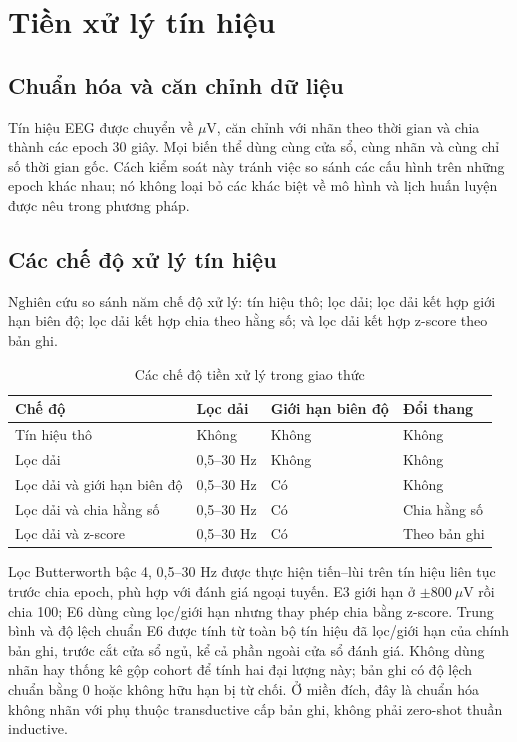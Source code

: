 \section{Tiền xử lý tín hiệu}
\label{sec:preprocessing}

\subsection{Chuẩn hóa và căn chỉnh dữ liệu}

Tín hiệu EEG được chuyển về $\mu\mathrm{V}$, căn chỉnh với nhãn theo thời gian và chia thành các epoch 30 giây. Mọi biến thể dùng cùng cửa sổ, cùng nhãn và cùng chỉ số thời gian gốc. Cách kiểm soát này tránh việc so sánh các cấu hình trên những epoch khác nhau; nó không loại bỏ các khác biệt về mô hình và lịch huấn luyện được nêu trong phương pháp.

\subsection{Các chế độ xử lý tín hiệu}

Nghiên cứu so sánh năm chế độ xử lý: tín hiệu thô; lọc dải; lọc dải kết hợp giới hạn biên độ; lọc dải kết hợp chia theo hằng số; và lọc dải kết hợp z-score theo bản ghi.

\begin{table}[H]
\centering
\caption{Các chế độ tiền xử lý trong giao thức}
\label{tab:preprocessing_variants}
\begin{tabularx}{\textwidth}{lYYY}
\toprule
\textbf{Chế độ} & \textbf{Lọc dải} & \textbf{Giới hạn biên độ} & \textbf{Đổi thang} \\
\midrule
Tín hiệu thô & Không & Không & Không \\
Lọc dải & 0,5--30 Hz & Không & Không \\
Lọc dải và giới hạn biên độ & 0,5--30 Hz & Có & Không \\
Lọc dải và chia hằng số & 0,5--30 Hz & Có & Chia hằng số \\
Lọc dải và z-score & 0,5--30 Hz & Có & Theo bản ghi \\
\bottomrule
\end{tabularx}
\end{table}

Lọc Butterworth bậc 4, 0,5--30 Hz được thực hiện tiến--lùi trên tín hiệu liên tục trước chia epoch, phù hợp với đánh giá ngoại tuyến. E3 giới hạn ở $\pm800~\mu\mathrm{V}$ rồi chia 100; E6 dùng cùng lọc/giới hạn nhưng thay phép chia bằng z-score. Trung bình và độ lệch chuẩn E6 được tính từ toàn bộ tín hiệu đã lọc/giới hạn của chính bản ghi, trước cắt cửa sổ ngủ, kể cả phần ngoài cửa sổ đánh giá. Không dùng nhãn hay thống kê gộp cohort để tính hai đại lượng này; bản ghi có độ lệch chuẩn bằng 0 hoặc không hữu hạn bị từ chối. Ở miền đích, đây là chuẩn hóa không nhãn với phụ thuộc transductive cấp bản ghi, không phải zero-shot thuần inductive.

